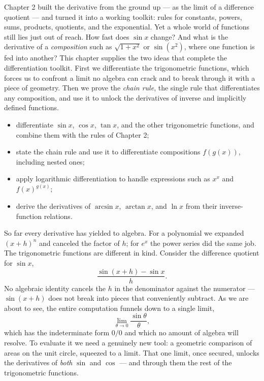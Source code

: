\begin{hklead}
Chapter 2 built the derivative from the ground up — as the limit of a difference quotient — and turned it into a working toolkit: rules for constants, powers, sums, products, quotients, and the exponential. Yet a whole world of functions still lies just out of reach. How fast does \(\sin x\) change? And what is the derivative of a \emph{composition} such as \(\sqrt{1 + x^{2}}\) or \(\sin(x^{2})\), where one function is fed into another? This chapter supplies the two ideas that complete the differentiation toolkit. First we differentiate the trigonometric functions, which forces us to confront a limit no algebra can crack and to break through it with a piece of geometry. Then we prove the \emph{chain rule}, the single rule that differentiates any composition, and use it to unlock the derivatives of inverse and implicitly defined functions.
\end{hklead}
\begin{itemize}
  \item differentiate \(\sin x\), \(\cos x\), \(\tan x\), and the other trigonometric functions, and combine them with the rules of Chapter 2;
  \item state the chain rule and use it to differentiate compositions \(f(g(x))\), including nested ones;
  \item apply logarithmic differentiation to handle expressions such as \(x^{x}\) and \(f(x)^{g(x)}\);
  \item derive the derivatives of \(\arcsin x\), \(\arctan x\), and \(\ln x\) from their inverse-function relations.
\end{itemize}
So far every derivative has yielded to algebra. For a polynomial we expanded \((x + h)^{n}\) and canceled the factor of \(h\); for \(e^{x}\) the power series did the same job. The trigonometric functions are different in kind. Consider the difference quotient for \(\sin x\), \[ \frac{\sin(x + h) - \sin x}{h}. \] No algebraic identity cancels the \(h\) in the denominator against the numerator — \(\sin(x + h)\) does not break into pieces that conveniently subtract. As we are about to see, the entire computation funnels down to a single limit, \[ \lim_{\theta \to 0} \frac{\sin \theta}{\theta}, \] which has the indeterminate form \(0/0\) and which no amount of algebra will resolve. To evaluate it we need a genuinely new tool: a geometric comparison of areas on the unit circle, squeezed to a limit. That one limit, once secured, unlocks the derivatives of \emph{both} \(\sin\) and \(\cos\) — and through them the rest of the trigonometric functions.

